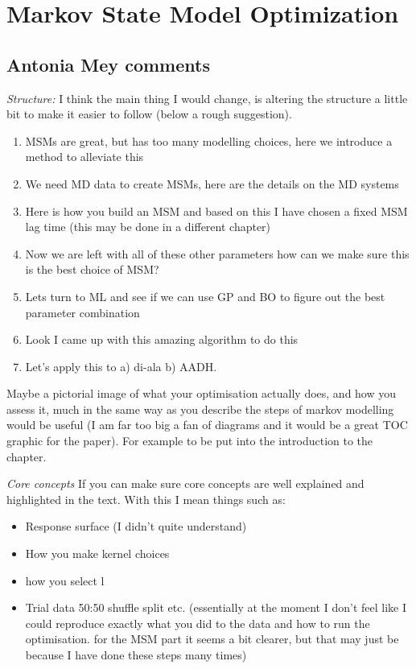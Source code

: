\let\textcircled=\pgftextcircled
\chapter{Markov State Model Optimization}\label{chap:msm}


\section{Antonia Mey comments}
\emph{Structure:}
I think the main thing I would change,  is altering the structure a little bit to make it easier to follow (below a rough suggestion). 

\begin{enumerate}
    \item MSMs are great, but has too many modelling choices, here we introduce a method to alleviate this
    \item We need MD data to create MSMs, here are the details on the MD systems
    \item Here is how you build an MSM and based on this I have chosen a fixed MSM lag time (this may be done in a different chapter)
    \item Now we are left with all of these other parameters how can we make sure this is the best choice of MSM?
    \item Lets turn to ML and see if we can use GP and BO to figure out the best parameter combination
    \item Look I came up with this amazing algorithm to do this
    \item Let’s apply this to a) di-ala b) AADH.
\end{enumerate}

Maybe  a pictorial image of what your optimisation actually does, and how you assess it, much in the same way as you describe the steps of markov modelling would be useful (I am far too big a fan of diagrams and it would be a great TOC graphic for the paper). For example to be put into the introduction to the chapter.

\emph{Core concepts}
If you can make sure core concepts are well explained and highlighted in the text. With this I mean things such as:
\begin{itemize}
    \item Response surface (I didn’t quite understand)
    \item How you make kernel choices
    \item how you select l
    \item Trial data 50:50 shuffle split etc. (essentially at the moment I don’t feel like I could reproduce exactly what you did to the data and how to run the optimisation. for the MSM part it seems a bit clearer, but that may just be because I have done these steps many times)
\end{itemize}


